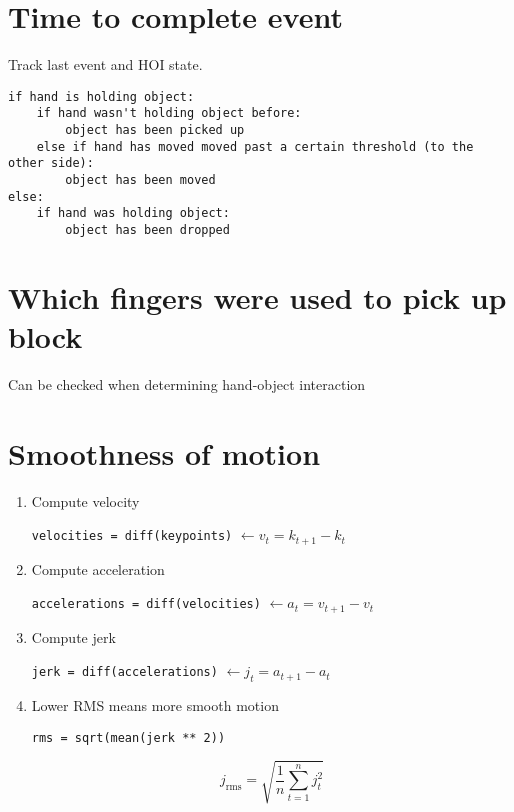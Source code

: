 \documentclass{article}
\begin{document}
\section*{Time to complete event}
Track last event and HOI state.
\vspace{1em}
\begin{verbatim}
if hand is holding object:
    if hand wasn't holding object before:
        object has been picked up
    else if hand has moved moved past a certain threshold (to the other side):
        object has been moved
else:
    if hand was holding object:
        object has been dropped
\end{verbatim}

\section*{Which fingers were used to pick up block}

Can be checked when determining hand-object interaction

\section*{Smoothness of motion}

\begin{enumerate}
    \item Compute velocity
    \begin{center}\verb|velocities = diff(keypoints)| $\leftarrow v_t=k_{t+1}-k_t$\end{center}
    \item Compute acceleration
    \begin{center}\verb|accelerations = diff(velocities)| $\leftarrow a_t=v_{t+1}-v_t$\end{center}
    \item Compute jerk
    \begin{center}\verb|jerk = diff(accelerations)| $\leftarrow j_t=a_{t+1}-a_t$\end{center}
    \item Lower RMS means more smooth motion
    \begin{center}\verb|rms = sqrt(mean(jerk ** 2))|\end{center}
    \[j_\text{rms}=\sqrt{\frac{1}{n}\sum_{t=1}^{n}j_t^2}\]
\end{enumerate}
\end{document}
